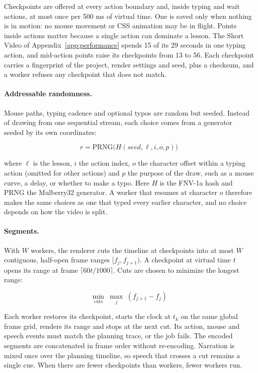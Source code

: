 \documentclass[11pt, a4paper]{article}
\begin{document}
Checkpoints are offered at every action boundary and, inside typing and wait actions, at most once per 500 ms of virtual time. One is saved only when nothing is in motion: no mouse movement or CSS animation may be in flight. Points inside actions matter because a single action can dominate a lesson. The Short Video of Appendix~\ref{app:performance} spends 15 of its 29 seconds in one typing action, and mid-action points raise its checkpoints from 13 to 56. Each checkpoint carries a fingerprint of the project, render settings and seed, plus a checksum, and a worker refuses any checkpoint that does not match.

\paragraph{Addressable randomness.} Mouse paths, typing cadence and optional typos are random but seeded. Instead of drawing from one sequential stream, each choice comes from a generator seeded by its own coordinates:

\[
r = \mathrm{PRNG}\big(H(\mathit{seed}, \ell, i, o, p)\big)
\]

where \(\ell\) is the lesson, \(i\) the action index, \(o\) the character offset within a typing action (omitted for other actions) and \(p\) the purpose of the draw, such as a mouse curve, a delay, or whether to make a typo. Here \(H\) is the FNV-1a hash and PRNG the Mulberry32 generator. A worker that resumes at character \(o\) therefore makes the same choices as one that typed every earlier character, and no choice depends on how the video is split.

\paragraph{Segments.} With \(W\) workers, the renderer cuts the timeline at checkpoints into at most \(W\) contiguous, half-open frame ranges \([f_j, f_{j+1})\). A checkpoint at virtual time \(t\) opens its range at frame \(\lceil 60t/1000 \rceil\). Cuts are chosen to minimize the longest range:

\[
\min_{\text{cuts}} \; \max_{j} \; (f_{j+1} - f_j)
\]

Each worker restores its checkpoint, starts the clock at \(t_k\) on the same global frame grid, renders its range and stops at the next cut. Its action, mouse and speech events must match the planning trace, or the job fails. The encoded segments are concatenated in frame order without re-encoding. Narration is mixed once over the planning timeline, so speech that crosses a cut remains a single cue. When there are fewer checkpoints than workers, fewer workers run.
\end{document}
